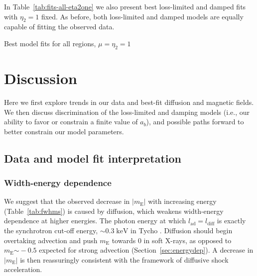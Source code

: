 \documentclass[manuscript]{aastex}  %
\newcommand*{\mt}{\mathrm}
\newcommand*{\unit}[1]{\;\mt{#1}}  %
\newcommand*{\abt}{\mathord{\sim}} %
\newcommand*{\mE}{m_\mt{E}}
\begin{document}
In Table~\ref{tab:fits-all-eta2one} we also present best loss-limited and
damped fits with $\eta_2 = 1$ fixed.  As before, both loss-limited and damped
models are equally capable of fitting the observed data.

\begin{table}
    \scriptsize
    \centering
    \caption{Best model fits for all regions, $\mu = \eta_2 = 1$
    \label{tab:fits-all-eta2one}}
    
\end{table}


\section{Discussion}

Here we first explore trends in our data and best-fit diffusion and magnetic
fields.  We then discuss discrimination of the loss-limited and damping models
(i.e., our ability to favor or constrain a finite value of $a_b$), and possible
paths forward to better constrain our model parameters.

\subsection{Data and model fit interpretation}

\subsubsection{Width-energy dependence}

We suggest that the observed decrease in $|\mE|$ with increasing energy
(Table~\ref{tab:fwhms}) is caused by diffusion, which weakens width-energy
dependence at higher energies.  The photon energy at which $l_{\mt{ad}} =
l_{\mt{diff}}$ is exactly the synchrotron cut-off energy,
$\abt 0.3 \unit{keV}$ in Tycho \citep{hwang2002}.  Diffusion should begin
overtaking advection and push $\mE$ towards $0$ in soft X-rays, as opposed to
$\mE \abt -0.5$ expected for strong advection (Section~\ref{sec:energydep}).  A
decrease in $|\mE|$ is then reassuringly consistent with the framework of
diffusive shock acceleration.
\end{document}

